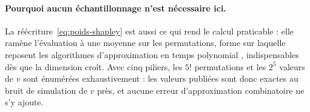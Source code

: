 \paragraph{Pourquoi aucun échantillonnage n'est nécessaire ici.}
La réécriture~\eqref{eq:poids-shapley} est aussi ce qui rend le calcul praticable : elle ramène
l'évaluation à une moyenne sur les permutations, forme sur laquelle reposent les algorithmes
d'approximation en temps polynomial \citep{CastroGomezTejada2009, SongNelsonStaum2016},
indispensables dès que la dimension croît. Avec cinq piliers, les $5!$ permutations et les $2^5$
valeurs de $v$ sont énumérées exhaustivement : les valeurs publiées sont donc exactes au bruit de
simulation de $v$ près, et aucune erreur d'approximation combinatoire ne s'y ajoute.

